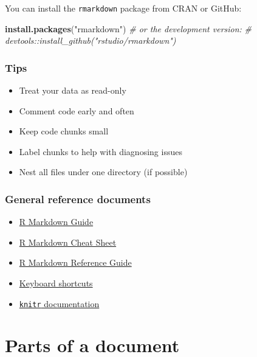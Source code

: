\documentclass[
  openany]{book}
\newenvironment{Shaded}{\begin{snugshade}}{\end{snugshade}}
\newcommand{\CommentTok}[1]{\textcolor[rgb]{0.56,0.35,0.01}{\textit{#1}}}
\newcommand{\KeywordTok}[1]{\textcolor[rgb]{0.13,0.29,0.53}{\textbf{#1}}}
\newcommand{\NormalTok}[1]{#1}
\newcommand{\StringTok}[1]{\textcolor[rgb]{0.31,0.60,0.02}{#1}}
\providecommand{\tightlist}{%
  \setlength{\itemsep}{0pt}\setlength{\parskip}{0pt}}
\begin{document}
You can install the \texttt{rmarkdown} package from CRAN or GitHub:

\begin{Shaded}
\begin{Highlighting}[]
\KeywordTok{install.packages}\NormalTok{(}\StringTok{"rmarkdown"}\NormalTok{)}
\CommentTok{# or the development version:}
\CommentTok{# devtools::install_github("rstudio/rmarkdown")}
\end{Highlighting}
\end{Shaded}

\hypertarget{tips}{%
\subsection{Tips}\label{tips}}

\begin{itemize}
\tightlist
\item
  Treat your data as read-only
\item
  Comment code early and often
\item
  Keep code chunks small
\item
  Label chunks to help with diagnosing issues
\item
  Nest all files under one directory (if possible)
\end{itemize}

\hypertarget{general-reference-documents}{%
\subsection{General reference documents}\label{general-reference-documents}}

\begin{itemize}
\tightlist
\item
  \href{https://bookdown.org/yihui/rmarkdown/}{R Markdown Guide}
\item
  \href{https://rstudio.com/wp-content/uploads/2016/03/rmarkdown-cheatsheet-2.0.pdf}{R Markdown Cheat Sheet}
\item
  \href{https://rstudio.com/wp-content/uploads/2015/03/rmarkdown-reference.pdf}{R Markdown Reference Guide}
\item
  \href{https://support.rstudio.com/hc/en-us/articles/200711853-Keyboard-Shortcuts}{Keyboard shortcuts}
\item
  \href{https://yihui.org/knitr/}{\texttt{knitr} documentation}
\end{itemize}

\hypertarget{intro}{%
\chapter{Parts of a document}\label{intro}}
\end{document}
